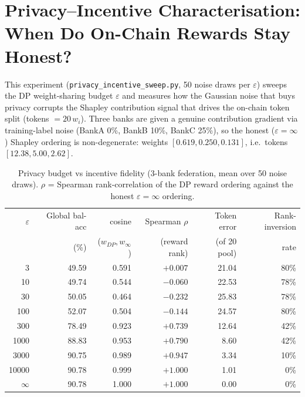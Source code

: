 \FloatBarrier

\section{Privacy--Incentive Characterisation: When Do On-Chain Rewards Stay Honest?}
\label{sec:privacy-incentive}

This experiment (\texttt{privacy\_incentive\_sweep.py}, 50 noise draws per $\varepsilon$) sweeps the DP weight-sharing budget $\varepsilon$ and measures how the Gaussian noise that buys privacy corrupts the Shapley contribution signal that drives the on-chain token split (tokens $=20\,w_i$). Three banks are given a genuine contribution gradient via training-label noise (BankA 0\%, BankB 10\%, BankC 25\%), so the honest ($\varepsilon=\infty$) Shapley ordering is non-degenerate: weights $[0.619, 0.250, 0.131]$, i.e.\ tokens $[12.38, 5.00, 2.62]$.

\begin{table}[H]
\centering
\caption{Privacy budget vs incentive fidelity (3-bank federation, mean over 50 noise draws). $\rho$ = Spearman rank-correlation of the DP reward ordering against the honest $\varepsilon=\infty$ ordering.}
\label{tab:privacy_incentive}
\small\setlength{\tabcolsep}{4pt}
\begin{tabular}{|r|r|r|r|r|r|}
\hline
$\varepsilon$ & Global bal-acc & cosine & Spearman $\rho$ & Token error & Rank-inversion \\
              & (\%)           & ($w_{DP},w_\infty$) & (reward rank) & (of 20 pool) & rate \\ \hline
3      & 49.59 & 0.591 & $+0.007$ & 21.04 & 80\% \\ \hline
10     & 49.74 & 0.544 & $-0.060$ & 22.53 & 78\% \\ \hline
30     & 50.05 & 0.464 & $-0.232$ & 25.83 & 78\% \\ \hline
100    & 52.07 & 0.504 & $-0.144$ & 24.57 & 80\% \\ \hline
300    & 78.49 & 0.923 & $+0.739$ & 12.64 & 42\% \\ \hline
1000   & 88.83 & 0.953 & $+0.790$ & 8.60  & 42\% \\ \hline
3000   & 90.75 & 0.989 & $+0.947$ & 3.34  & 10\% \\ \hline
10000  & 90.78 & 0.999 & $+1.000$ & 1.01  & 0\%  \\ \hline
$\infty$ & 90.78 & 1.000 & $+1.000$ & 0.00 & 0\% \\ \hline
\end{tabular}
\end{table}

